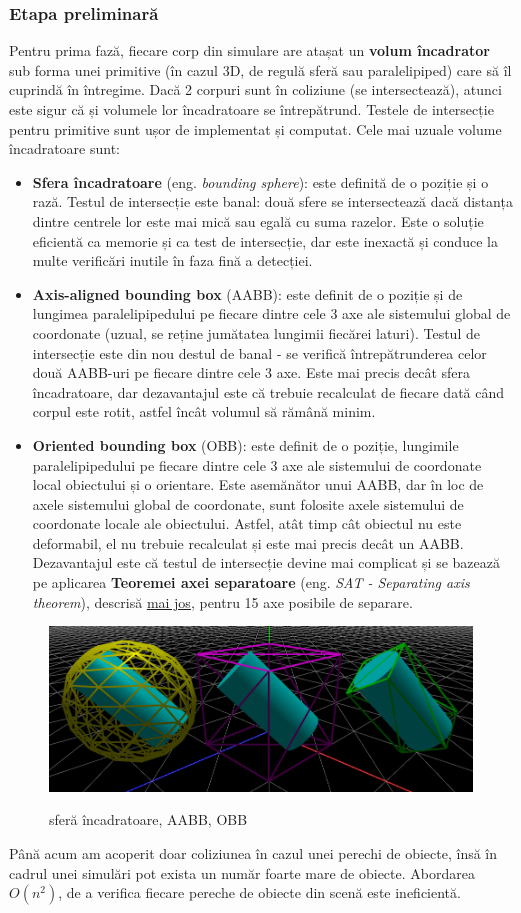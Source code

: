 \documentclass[12pt,a4paper]{report}
\begin{document}
\subsubsection{Etapa preliminară}
Pentru prima fază, fiecare corp din simulare are atașat un \textbf{volum încadrator} sub forma unei primitive (în cazul 3D, de regulă sferă sau paralelipiped) care să îl cuprindă în întregime. Dacă 2 corpuri sunt în coliziune (se intersectează), atunci este sigur că și volumele lor încadratoare se întrepătrund. Testele de intersecție pentru primitive sunt ușor de implementat și computat.
Cele mai uzuale volume încadratoare sunt:
\begin{itemize}
	\item \textbf{Sfera încadratoare} (eng. \textit{bounding sphere}): este definită de o poziție și o rază. Testul de intersecție este banal: două sfere se intersectează dacă distanța dintre centrele lor este mai mică sau egală cu suma razelor. Este o soluție eficientă ca memorie și ca test de intersecție, dar este inexactă și conduce la multe verificări inutile în faza fină a detecției.
	\item \textbf{Axis-aligned bounding box} (AABB): este definit de o poziție și de lungimea paralelipipedului pe fiecare dintre cele 3 axe ale sistemului global de coordonate (uzual, se reține jumătatea lungimii fiecărei laturi). Testul de intersecție este din nou destul de banal - se verifică întrepătrunderea celor două AABB-uri pe fiecare dintre cele 3 axe. Este mai precis decât sfera încadratoare, dar dezavantajul este că trebuie recalculat de fiecare dată când corpul este rotit, astfel încât volumul să rămână minim.
	\item \textbf{Oriented bounding box} (OBB): este definit de o poziție, lungimile paralelipipedului pe fiecare dintre cele 3 axe ale sistemului de coordonate local obiectului și o orientare. Este asemănător unui AABB, dar în loc de axele sistemului global de coordonate, sunt folosite axele sistemului de coordonate locale ale obiectului. Astfel, atât timp cât obiectul nu este deformabil, el nu trebuie recalculat și este mai precis decât un AABB. Dezavantajul este că testul de intersecție devine mai complicat și se bazează pe aplicarea \textbf{Teoremei axei separatoare} (eng. \textit{SAT - Separating axis theorem}), descrisă \hyperref[SAT]{mai jos}, pentru 15 axe posibile de separare.
\end{itemize}
\begin{figure}[H]
	\centering
	\includegraphics[width=0.7\linewidth]{pics/cap3_00.png}
	\label{fig:cap3_00}
	\caption[volume încadratoare uzuale]{sferă încadratoare, AABB, OBB}
\end{figure}
Până acum am acoperit doar coliziunea în cazul unei perechi de obiecte, însă în cadrul unei simulări pot exista un număr foarte mare de obiecte. Abordarea $O(n^2)$, de a verifica fiecare pereche de obiecte din scenă este ineficientă.
\end{document}
